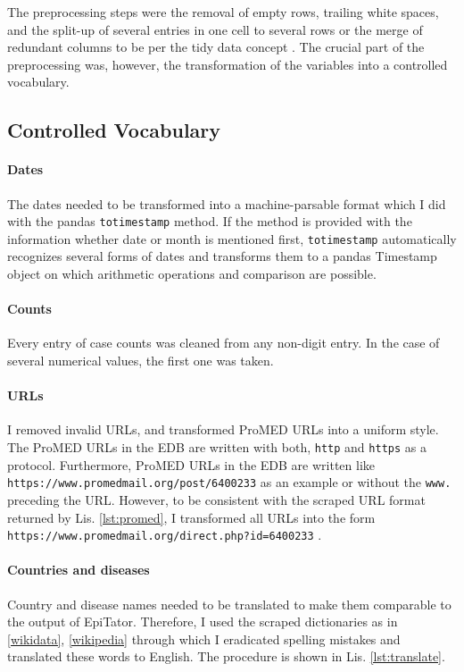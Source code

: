 The preprocessing steps were the removal of empty rows, trailing white spaces, and the split-up of several entries in one cell to several rows or the merge of redundant columns to be per the tidy data concept \citep{Wickham2014}.
The crucial part of the preprocessing was, however, the transformation of the variables into a controlled vocabulary.

\subsection{Controlled Vocabulary}\label{controlled vocabulary}
\paragraph{Dates}
The dates needed to be transformed into a machine-parsable format which I did with the pandas \texttt{totimestamp} method. If the method is provided with the information whether date or month is mentioned first, \texttt{totimestamp} automatically recognizes several forms of dates and transforms them to a pandas Timestamp object on which arithmetic operations and comparison are possible.

\paragraph{Counts}
Every entry of case counts was cleaned from any non-digit entry. In the case of several numerical values, the first one was taken.

\paragraph{URLs}
I removed invalid URLs, and transformed ProMED URLs into a uniform style. The ProMED URLs in the EDB are written with both, \texttt{http} and \texttt{https} as a protocol. Furthermore, ProMED URLs in the EDB are written like \textquotesingle \texttt{https://www.promedmail.org/post/6400233} \textquotesingle as an example or without the \texttt{www.} preceding the URL. However, to be consistent with the scraped URL format returned by Lis. \ref{lst:promed}, I transformed all URLs into the form \textquotesingle \texttt{https://\allowbreak www.promedmail.org/\allowbreak direct.php?id=6400233} \textquotesingle.

\paragraph{Countries and diseases}
Country and disease names needed to be translated to make them comparable to the output of EpiTator. Therefore, I used the scraped dictionaries as in \ref{wikidata}, \ref{wikipedia} through which I eradicated spelling mistakes and translated these words to English. The procedure is shown in Lis. \ref{lst:translate}.

